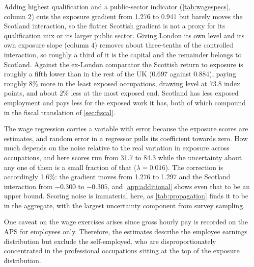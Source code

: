 Adding highest qualification and a public-sector indicator (\cref{tab:wagespecs}, column 2) cuts the exposure gradient from 1.276 to 0.941 but barely moves the Scotland interaction, so the flatter Scottish gradient is not a proxy for its qualification mix or its larger public sector. Giving London its own level and its own exposure slope (column 4) removes about three-tenths of the controlled interaction, so roughly a third of it is the capital and the remainder belongs to Scotland. 
Against the ex-London comparator the Scottish return to exposure is roughly a fifth lower than in the rest of the UK (0.697 against 0.884), paying roughly 8\% more in the least exposed occupations, drawing level at 73.8 index points, and about 2\% less at the most exposed end. Scotland has less exposed employment and pays less for the exposed work it has, both of which compound in the fiscal translation of \cref{sec:fiscal}.

The wage regression carries a variable with error because the exposure scores are estimates, and random error in a regressor pulls its coefficient towards zero. How much depends on the noise relative to the real variation in exposure across occupations, and here scores run from 31.7 to 84.3 while the uncertainty about any one of them is a small fraction of that ($\lambda = 0.016$). The correction is accordingly 1.6\%: the gradient moves from 1.276 to 1.297 and the Scotland interaction from $-0.300$ to $-0.305$, and \cref{app:additional} shows even that to be an upper bound. Scoring noise is immaterial here, as \cref{tab:propagation} finds it to be in the aggregate, with the largest uncertainty component from survey sampling. 


One caveat on the wage exercises arises since gross hourly pay is recorded on the APS for employees only. Therefore, the estimates describe the employee earnings distribution but exclude the self-employed, who are disproportionately concentrated in the professional occupations sitting at the top of the exposure distribution.